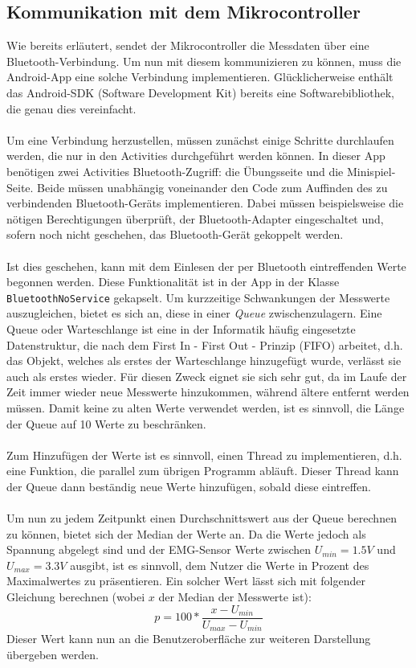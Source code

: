 \subsection{Kommunikation mit dem Mikrocontroller}
Wie bereits erläutert, sendet der Mikrocontroller die Messdaten über eine Bluetooth-Verbindung. Um nun mit  diesem kommunizieren zu können, muss die Android-App eine solche Verbindung implementieren. Glücklicherweise enthält das Android-SDK (Software Development Kit) bereits eine Softwarebibliothek, die genau dies vereinfacht. \\ \\
Um eine Verbindung herzustellen, müssen zunächst einige Schritte durchlaufen werden, die nur in den Activities durchgeführt werden können. In dieser App benötigen zwei Activities Bluetooth-Zugriff: die Übungsseite und die Minispiel-Seite. Beide müssen unabhängig voneinander den Code zum Auffinden des zu verbindenden Bluetooth-Geräts implementieren. Dabei müssen beispielsweise die nötigen Berechtigungen überprüft, der Bluetooth-Adapter eingeschaltet und, sofern noch nicht geschehen, das Bluetooth-Gerät gekoppelt werden. \\ \\
Ist dies geschehen, kann mit dem Einlesen der per Bluetooth eintreffenden Werte begonnen werden. Diese Funktionalität ist in der App in der Klasse \texttt{BluetoothNoService} gekapselt. Um kurzzeitige Schwankungen der Messwerte auszugleichen, bietet es sich an, diese in einer \textit{Queue} zwischenzulagern. Eine Queue oder Warteschlange ist eine in der Informatik häufig eingesetzte Datenstruktur, die nach dem First In - First Out - Prinzip (FIFO) arbeitet, d.h. das Objekt, welches als erstes der Warteschlange hinzugefügt wurde, verlässt sie auch als erstes wieder. Für diesen Zweck eignet sie sich sehr gut, da im Laufe der Zeit immer wieder neue Messwerte hinzukommen, während ältere entfernt werden müssen. Damit keine zu alten Werte verwendet werden, ist es sinnvoll, die Länge der Queue auf 10 Werte zu beschränken. \\ \\
Zum Hinzufügen der Werte ist es sinnvoll, einen Thread zu implementieren, d.h. eine Funktion, die parallel zum übrigen Programm abläuft. Dieser Thread kann der Queue dann beständig neue Werte hinzufügen, sobald diese eintreffen. \\ \\
Um nun zu jedem Zeitpunkt einen Durchschnittswert aus der Queue berechnen zu können, bietet sich der Median der Werte an. Da die Werte jedoch als Spannung abgelegt sind und der EMG-Sensor Werte zwischen $U_{min} = 1.5 V$ und $U_{max} = 3.3 V$ ausgibt, ist es sinnvoll, dem Nutzer die Werte in Prozent des Maximalwertes zu präsentieren. Ein solcher Wert lässt sich mit folgender Gleichung berechnen (wobei $x$ der Median der Messwerte ist):
\begin{equation*}
p = 100 * \frac{x - U_{min}}{U_{max} - U_{min}}
\end{equation*}
Dieser Wert kann nun an die Benutzeroberfläche zur weiteren Darstellung übergeben werden.
